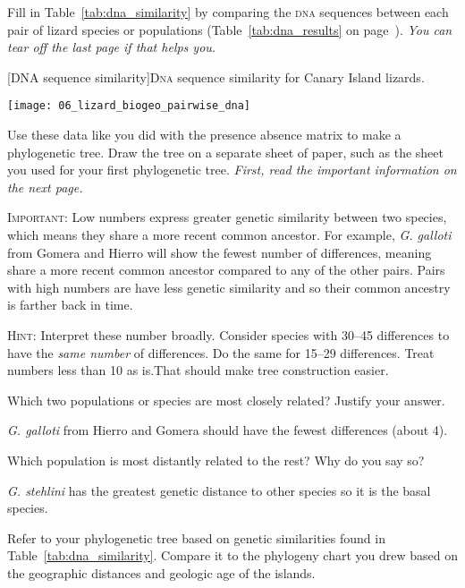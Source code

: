 \documentclass[12pt, hidelinks]{exam}
\newcommand*\AnswerBox[2]{%
    \parbox[t][#1]{0.92\textwidth}{%
    \begin{solution}#2\end{solution}}
    \vspace{\stretch{1}}
}
\begin{document}
\begin{questions}
\question
Fill in Table~\ref{tab:dna_similarity} by comparing the \textsc{dna} sequences between each pair of lizard species or populations (Table~\ref{tab:dna_results} on page~\pageref{tab:dna_results}). \emph{You can tear off the last page if that helps you.}

\vspace{\baselineskip}

{[DNA sequence similarity]{D\textsc{na} sequence similarity for Canary Island lizards.\label{tab:dna_similarity}}

	\texttt{[image: 06\_lizard\_biogeo\_pairwise\_dna]}
}

\question
Use these data like you did with the presence absence matrix to make a phylogenetic tree. Draw the tree on a separate sheet of paper, such as the sheet you used for your first phylogenetic tree. \emph{First, read the important information on the next page.}

\textsc{Important:} Low numbers express greater genetic similarity between two species, which means they share a more recent common ancestor. For example, \textit{G. galloti} from Gomera and Hierro will show the fewest number of differences, meaning share a more recent common ancestor compared to any of the other pairs. Pairs with high numbers are have less genetic similarity and so their common ancestry is farther back in time.

\textsc{Hint:} Interpret these number broadly. Consider species with 30–45 differences to have the \emph{same number} of differences. Do the same for 15–29 differences. Treat numbers less than 10 as is.That should make tree construction easier. 

\question
Which two populations or species are most closely related? Justify your answer. 

\AnswerBox{2\baselineskip}{\textit{G. galloti} from Hierro and Gomera should have the fewest differences (about 4).}

\question
Which population is most distantly related to the rest? Why do you say so? 

\AnswerBox{2\baselineskip}{\textit{G. stehlini} has the greatest genetic distance to other species so it is the basal species.}

Refer to your phylogenetic tree based on genetic similarities found in Table~\ref{tab:dna_similarity}. Compare it to the phylogeny chart you drew based on the geographic distances and geologic age of the islands. 


\end{questions}
\end{document}
